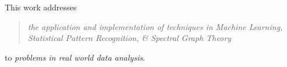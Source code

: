 
This work addresses


\begin{quote}
{\em the application and implementation of techniques in Machine Learning, Statistical Pattern
Recognition, \& Spectral Graph Theory }
\end{quote}
to {\em problems in real world data analysis}.

\medskip
